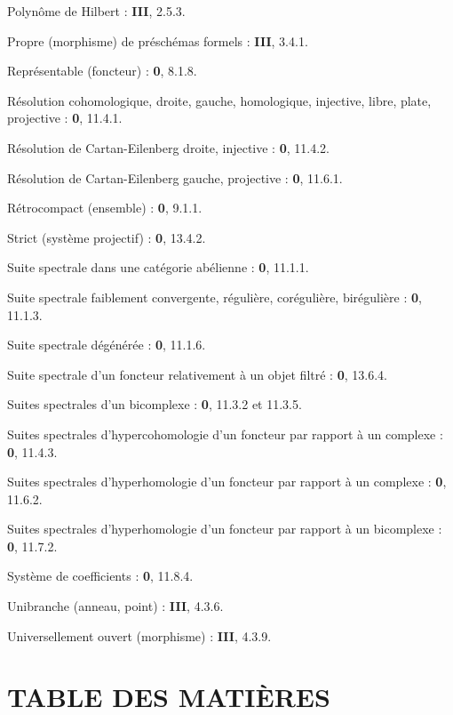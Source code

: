 \begin{flushleft}
Polynôme de Hilbert : \textbf{III}, 2.5.3.

Propre (morphisme) de préschémas formels : \textbf{III}, 3.4.1.

Représentable (foncteur) : \textbf{0}, 8.1.8.

Résolution cohomologique, droite, gauche, homologique, injective, libre,
plate, projective : \textbf{0}, 11.4.1.

Résolution de Cartan-Eilenberg droite, injective : \textbf{0}, 11.4.2.

Résolution de Cartan-Eilenberg gauche, projective : \textbf{0}, 11.6.1.

Rétrocompact (ensemble) : \textbf{0}, 9.1.1.

Strict (système projectif) : \textbf{0}, 13.4.2.

Suite spectrale dans une catégorie abélienne : \textbf{0}, 11.1.1.

Suite spectrale faiblement convergente, régulière, corégulière, birégulière :
\textbf{0}, 11.1.3.

Suite spectrale dégénérée : \textbf{0}, 11.1.6.

Suite spectrale d'un foncteur relativement à un objet filtré : \textbf{0}, 13.6.4.

Suites spectrales d'un bicomplexe : \textbf{0}, 11.3.2 et 11.3.5.

Suites spectrales d'hypercohomologie d'un foncteur par rapport à un complexe :
\textbf{0}, 11.4.3.

Suites spectrales d'hyperhomologie d'un foncteur par rapport à un complexe :
\textbf{0}, 11.6.2.

Suites spectrales d'hyperhomologie d'un foncteur par rapport à un bicomplexe :
\textbf{0}, 11.7.2.

Système de coefficients : \textbf{0}, 11.8.4.

Unibranche (anneau, point) : \textbf{III}, 4.3.6.

Universellement ouvert (morphisme) : \textbf{III}, 4.3.9.
\end{flushleft}

\clearpage
{}
\section*{TABLE DES MATIÈRES}

